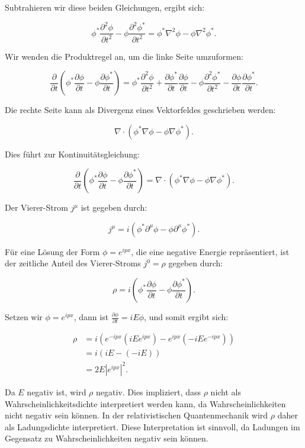 \documentclass[11pt,a4paper]{article}
\begin{document}
Subtrahieren wir diese beiden Gleichungen, ergibt sich:

\[
\phi^* \frac{\partial^2 \phi}{\partial t^2} - \phi \frac{\partial^2 \phi^*}{\partial t^2} = \phi^* \nabla^2 \phi - \phi \nabla^2 \phi^*.
\]

Wir wenden die Produktregel an, um die linke Seite umzuformen:

\[
\frac{\partial}{\partial t} \left(\phi^* \frac{\partial \phi}{\partial t} - \phi \frac{\partial \phi^*}{\partial t}\right) = \phi^* \frac{\partial^2 \phi}{\partial t^2} + \frac{\partial \phi^*}{\partial t} \frac{\partial \phi}{\partial t} - \phi \frac{\partial^2 \phi^*}{\partial t^2} - \frac{\partial \phi}{\partial t} \frac{\partial \phi^*}{\partial t}.
\]

Die rechte Seite kann als Divergenz eines Vektorfeldes geschrieben werden:

\[
\nabla \cdot \left(\phi^* \nabla \phi - \phi \nabla \phi^*\right).
\]

Dies führt zur Kontinuitätsgleichung:

\[
\frac{\partial}{\partial t} \left(\phi^* \frac{\partial \phi}{\partial t} - \phi \frac{\partial \phi^*}{\partial t}\right) = \nabla \cdot \left(\phi^* \nabla \phi - \phi \nabla \phi^*\right).
\]

Der Vierer-Strom \(j^\mu\) ist gegeben durch:

\[
j^\mu = i\left(\phi^* \partial^\mu \phi - \phi \partial^\mu \phi^*\right).
\]

Für eine Lösung der Form \(\phi = e^{i p x}\), die eine negative Energie repräsentiert, ist der zeitliche Anteil des Vierer-Stroms \(j^0 = \rho\) gegeben durch:

\[
\rho = i\left(\phi^* \frac{\partial \phi}{\partial t} - \phi \frac{\partial \phi^*}{\partial t}\right).
\]

Setzen wir \(\phi = e^{i p x}\), dann ist \(\frac{\partial \phi}{\partial t} = i E \phi\), und somit ergibt sich:

\[
\begin{align*}
\rho &= i\left(e^{-i p x} (i E e^{i p x}) - e^{i p x} (-i E e^{-i p x})\right) \\
&= i\left(i E - (-i E)\right) \\
&= 2 E |e^{i p x}|^2.
\end{align*}
\]

Da \(E\) negativ ist, wird \(\rho\) negativ. Dies impliziert, dass \(\rho\) nicht als Wahrscheinlichkeitsdichte interpretiert werden kann, da Wahrscheinlichkeiten nicht negativ sein können. In der relativistischen Quantenmechanik wird \(\rho\) daher als Ladungsdichte interpretiert. Diese Interpretation ist sinnvoll, da Ladungen im Gegensatz zu Wahrscheinlichkeiten negativ sein können.
\end{document}
